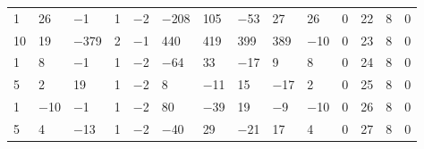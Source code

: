 \documentclass[10pt,a4paper]{amsart}
\numberwithin{equation}{section}
\theoremstyle{definition}
\numberwithin{table}{section}
\begin{document}
{\begin{paracol}{3}
\begin{supertabular}{|w{c}{.32cm}w{c}{.32cm}w{c}{.32cm}@{\hspace{.5cm}}w{c}{.2cm}w{c}{.2cm}|@{\hspace{\tabcolsep}}HHHHHHw{c}{.17cm}w{c}{.17cm}w{c}{.17cm}|}
			1 & 26 & $-$1 & 1 & $-$2 & $-$208 & 105 & $-$53 & 27 & 26 & 0 & 22 & 8 & 0 \\
			10 & 19 & $-$379 & 2 & $-$1 & 440 & 419 & 399 & 389 & $-$10 & 0 & 23 & 8 & 0 \\
			1 & 8 & $-$1 & 1 & $-$2 & $-$64 & 33 & $-$17 & 9 & 8 & 0 & 24 & 8 & 0 \\
			5 & 2 & 19 & 1 & $-$2 & 8 & $-$11 & 15 & $-$17 & 2 & 0 & 25 & 8 & 0 \\
			1 & $-$10 & $-$1 & 1 & $-$2 & 80 & $-$39 & 19 & $-$9 & $-$10 & 0 & 26 & 8 & 0 \\
			5 & 4 & $-$13 & 1 & $-$2 & $-$40 & 29 & $-$21 & 17 & 4 & 0 & 27 & 8 & 0 \\\hline
		\end{supertabular}
		
		\switchcolumn
		

\end{paracol}}
\end{document}
